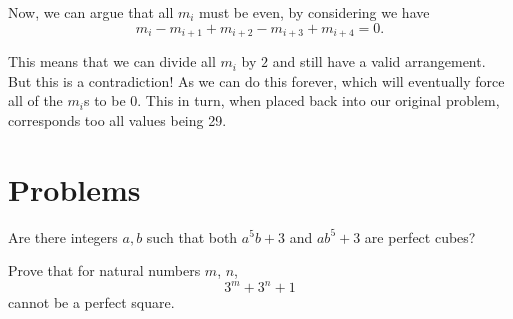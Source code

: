 \documentclass{article}
\theoremstyle{mytheoremstyle}
\theoremstyle{mytheoremstyle}
\theoremstyle{myproblemstyle}
\theoremstyle{myproblemstyle}
\begin{document}
    Now, we can argue that all $m_i$ must be even, by considering we have $$m_i - m_{i+1} + m_{i+2} - m_{i+3} + m_{i+4} = 0.$$

    This means that we can divide all $m_i$ by $2$ and still have a valid arrangement. But this is a contradiction! As we can do this forever, which will eventually force all of the $m_i$s to be 0. This in turn, when placed back into our original problem, corresponds too all values being 29.

    \pagebreak

    \section{Problems}
    \begin{problem}
        Are there integers $a, b$ such that both $a^5b + 3$ and $ab^5 + 3$ are perfect cubes?
    \end{problem}

    \begin{problem}
        Prove that for natural numbers $m$, $n$, 
        \[3^m + 3^n + 1\]
        cannot be a perfect square.
    \end{problem}





    
\end{document}
